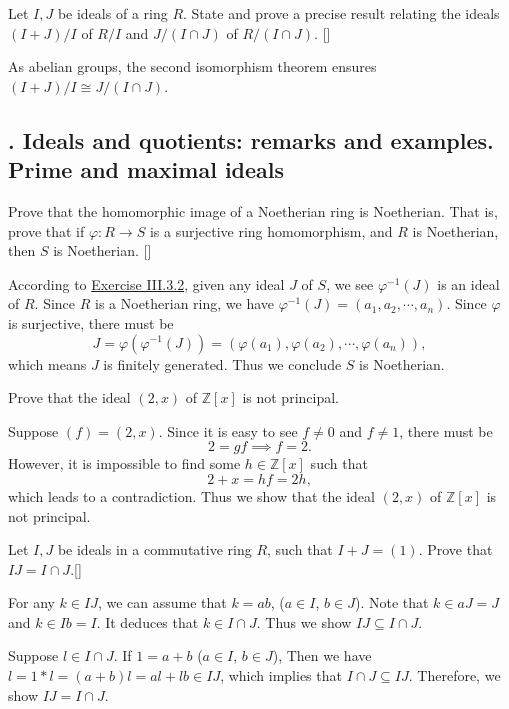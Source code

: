 \documentclass[12pt,letterpaper,boxed]{hmcpset}
\newcommand{\Z}{\mathbb{Z}}
\begin{document}
\begin{problem}[3.17]
Let $I, J$ be ideals of a ring $R$. State and prove a precise result relating the ideals $(I + J)/I$ of $R/I$ and $J/(I \cap J)$ of $R/(I \cap J)$. []
\end{problem}
\begin{solution}
As abelian groups, the second isomorphism theorem ensures $(I + J)/I\cong J/(I \cap J)$.
\end{solution}



\subsection{. Ideals and quotients: remarks and examples. Prime and maximal ideals}

\begin{problem}[4.2]
Prove that the homomorphic image of a Noetherian ring is Noetherian. That is, prove that if $\varphi: R \to S$ is a surjective ring homomorphism, and $R$ is Noetherian, then $S$ is Noetherian. []
\end{problem}
\begin{solution}
	According to \hyperlink{Exercise III.3.2}{Exercise III.3.2}, given any ideal $J$ of $S$, we see $\varphi^{-1}(J)$ is an ideal of $R$. Since $R$ is a Noetherian ring, we have $\varphi^{-1}(J)=(a_1,a_2,\cdots,a_n)$. Since $\varphi$ is surjective, there must be
	$$
	J=\varphi(\varphi^{-1}(J))=(\varphi(a_1),\varphi(a_2),\cdots,\varphi(a_n)),
	$$
	which means $J$ is finitely generated. Thus we conclude $S$ is Noetherian.
\end{solution}

\begin{problem}[4.3]
	Prove that the ideal $(2, x)$ of $\Z[x]$ is not principal.
\end{problem}
\begin{solution}
	Suppose $(f)=(2,x)$. Since it is easy to see $f\ne 0$ and $f\ne 1$, there must be 
	$$
	2=gf\implies f=2.
	$$ 
	However, it is impossible to find some $h\in \Z[x]$ such that
	\[
	2+x=hf=2h,
	\]
	which leads to a contradiction. Thus we show that the ideal $(2, x)$ of $\Z[x]$ is not principal.
\end{solution}

\hypertarget{Exercise III.4.5}{}
\begin{problem}[4.5]
Let $I, J$ be ideals in a commutative ring $R$, such that $I+J = (1)$. Prove that $IJ = I \cap J$.[]
\end{problem}
\begin{solution}
For any $k\in IJ$, we can assume that $k=ab$, ($a\in I$, $b\in J$). Note that $k\in aJ=J$ and $k\in Ib=I$. It deduces that $k\in I\cap J$. Thus we show $IJ\subseteq I\cap J$.

\noindent Suppose $l\in I\cap J$. If $1=a+b$ ($a\in I$, $b\in J$), Then we have $l=1*l=(a+b)l=al+lb\in IJ$, which implies that $I\cap J\subseteq IJ$. Therefore, we show $IJ = I \cap J$.
\end{solution}
\end{document}
